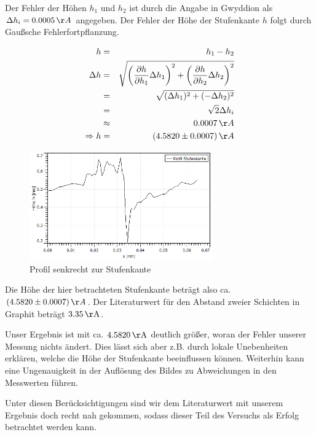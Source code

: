 \documentclass[12pt,a4paper]{scrartcl}
\numberwithin{equation}{section} %
\begin{document}
Der Fehler der Höhen $h_1$ und $h_2$ ist durch die Angabe in Gwyddion als $\Delta h_i = 0.0005 \,\AA$ angegeben. Der Fehler der Höhe der Stufenkante $h$ folgt durch Gaußsche Fehlerfortpflanzung.

\begin{eqnarray}
	h &=& h_1 - h_2 \\
	\Delta h &=& \sqrt{
			\left(\frac{\partial h}{\partial h_1} \Delta h_1\right)^2
			+ \left(\frac{\partial h}{\partial h_2} \Delta h_2\right)^2 } \\
			&=& \sqrt{(\Delta h_1)^2 + (-\Delta h_2)^2} \\
			&=& \sqrt{2} \Delta h_i \\
			&\approx& 0.0007 \,\AA \\
	\Rightarrow h &=& (4.5820 \pm 0.0007) \,\AA
\end{eqnarray}

\begin{figure}[h!]
	\centering
	\includegraphics[width=0.7\textwidth]{../media/B2.5/HOPG_Stufenkante_Profil.png}
	\caption{Profil senkrecht zur Stufenkante}
	\label{fig:stufenkante_profil}
\end{figure}

Die Höhe der hier betrachteten Stufenkante beträgt also ca. $(4.5820 \pm 0.0007) \,\AA$. Der Literaturwert für den Abstand zweier Schichten in Graphit beträgt $3.35 \mathrm{\, \normalfont{\AA}}$. \cite{Anleitung} %

Unser Ergebnis ist mit ca. $4.5820 \mathrm{\, \normalfont{\AA}}$ deutlich größer, woran der Fehler unserer Messung nichts ändert. Dies lässt sich aber z.B. durch lokale Unebenheiten erklären, welche die Höhe der Stufenkante beeinflussen können. Weiterhin kann eine Ungenauigkeit in der Auflösung des Bildes zu Abweichungen in den Messwerten führen.

Unter diesen Berücksichtigungen sind wir dem Literaturwert mit unserem Ergebnis doch recht nah gekommen, sodass dieser Teil des Versuchs als Erfolg betrachtet werden kann.
\end{document}
